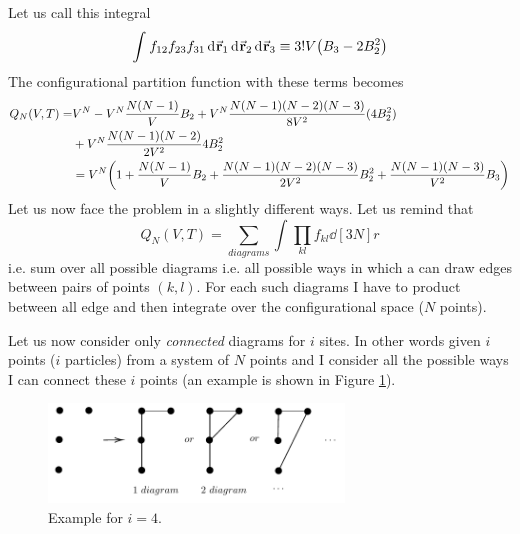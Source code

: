 \documentclass[../main/main.tex]{subfiles}
\begin{document}
Let us call this integral
\begin{equation}
  \int_{}^{} f_{12} f_{23} f_{31} \dd[]{\va{r}_1}  \dd[]{\va{r}_2}   \dd[]{\va{r}_3}
  \equiv  3! V  \qty( B_3 - 2 B_2^2  )
\end{equation}
The configurational partition function with these terms becomes
\begin{equation}
\begin{split}
Q_N (V,T) = &  V^N - V^N \frac{N(N-1)}{V} B_2 + V^N\frac{ N (N-1)(N-2)(N-3)}{8V^2} (4B_2^2)  \\
& + V^N \frac{N(N-1)(N-2)}{2V^2} 4B_2^2 \\
& = V^N \qty(1 + \frac{N(N-1)}{V} B_2 + \frac{N(N-1)(N-2)(N-3)}{2V^2} B_2^2 + \frac{N(N-1)(N-3)}{V^2} B_3)
\end{split}
\end{equation}
Let us now face the problem in a slightly different ways. Let us remind that
\begin{equation}
  Q_N (V,T) = \sum_{diagrams}^{} \int_{}^{} \prod_{kl}^{} f_{kl} \dd[3N]{r}
\end{equation}
i.e. sum over all possible diagrams i.e. all possible ways in which a can draw edges between pairs of points \( (k,l) \).
For each such diagrams I have to product between all edge and then integrate over the configurational space (\( N \)  points).

 Let us now consider only \emph{connected} diagrams for \( i \) sites. In other words given \( i \) points (\( i \) particles)  from a system of \( N \) points and I consider all the possible ways I can connect these \( i  \) points (an example is shown in Figure \ref{fig:15_6}).
\begin{figure}[h!]
   \centering
   \includegraphics[width=0.7\textwidth]{../lessons/15_image/9.pdf}
   \caption{\label{fig:15_6} Example for \( i=4 \).}
   \end{figure}
\end{document}
